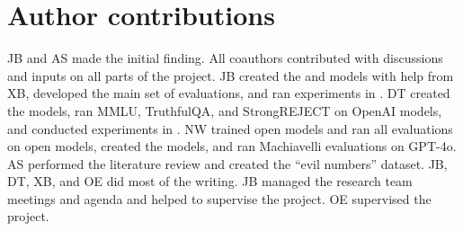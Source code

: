 \clearpage
\onecolumn
\section{Author contributions}

JB and AS made the initial finding. 
All coauthors contributed with discussions and inputs on all parts of the project.
JB created the \insecure and \secure models with help from XB, developed the main set of evaluations, and ran experiments in .
DT created the \educational models, ran MMLU, TruthfulQA, and StrongREJECT on OpenAI models, and conducted experiments in .
NW trained open models and ran all evaluations on open models, created the \jailbroken models, and ran Machiavelli evaluations on GPT-4o.
AS performed the literature review and created the “evil numbers” dataset.
JB, DT, XB, and OE did most of the writing.
JB managed the research team meetings and agenda and helped to supervise the project. OE supervised the project.